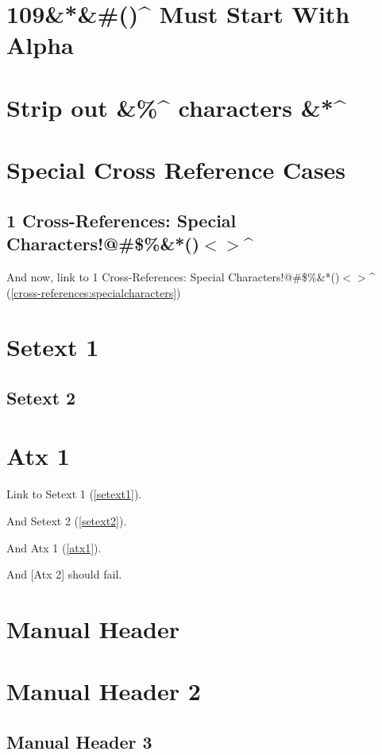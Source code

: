 
\def\mytitle{MultiMarkdown Autoreference Test}
\def\latexmode{memoir}


\chapter{109\&*\&\#()\^{} Must Start With Alpha}
\label{muststartwithalpha}

\chapter{Strip out \&\%\^{} characters \&*\^{}}
\label{stripoutcharacters}

\chapter{Special Cross Reference Cases}
\label{specialcrossreferencecases}

\section{1 Cross-References: Special Characters!@\#\$\%\&*()$<$$>$\^{}}
\label{cross-references:specialcharacters}

And now, link to 1 Cross-References: Special Characters!@\#\$\%\&*()$<$$>$\^{} (\autoref{cross-references:specialcharacters})

\chapter{Setext 1}
\label{setext1}

\section{Setext 2}
\label{setext2}

\chapter{Atx 1}
\label{atx1}

Link to Setext 1 (\autoref{setext1}).

And Setext 2 (\autoref{setext2}).

And Atx 1 (\autoref{atx1}).

And [Atx 2] should fail.

\chapter{Manual Header}
\label{label}

\chapter{Manual Header 2}
\label{label2}

\section{Manual Header 3}
\label{label3}




